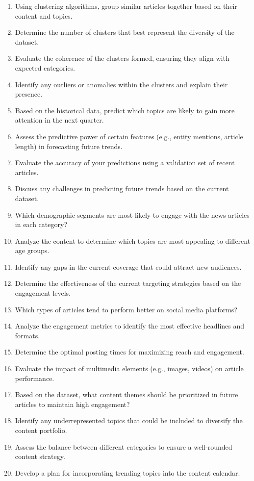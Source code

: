 \begin{footnotesize}
\begin{enumerate}
\item Using clustering algorithms, group similar articles together based on their content and topics.
\item Determine the number of clusters that best represent the diversity of the dataset.
\item Evaluate the coherence of the clusters formed, ensuring they align with expected categories.
\item Identify any outliers or anomalies within the clusters and explain their presence.
\item Based on the historical data, predict which topics are likely to gain more attention in the next quarter.
\item Assess the predictive power of certain features (e.g., entity mentions, article length) in forecasting future trends.
\item Evaluate the accuracy of your predictions using a validation set of recent articles.
\item Discuss any challenges in predicting future trends based on the current dataset.
\item Which demographic segments are most likely to engage with the news articles in each category?
\item Analyze the content to determine which topics are most appealing to different age groups.
\item Identify any gaps in the current coverage that could attract new audiences.
\item Determine the effectiveness of the current targeting strategies based on the engagement levels.
\item Which types of articles tend to perform better on social media platforms?
\item Analyze the engagement metrics to identify the most effective headlines and formats.
\item Determine the optimal posting times for maximizing reach and engagement.
\item Evaluate the impact of multimedia elements (e.g., images, videos) on article performance.
\item Based on the dataset, what content themes should be prioritized in future articles to maintain high engagement?
\item Identify any underrepresented topics that could be included to diversify the content portfolio.
\item Assess the balance between different categories to ensure a well-rounded content strategy.
\item Develop a plan for incorporating trending topics into the content calendar.

\end{enumerate}
\end{footnotesize}
